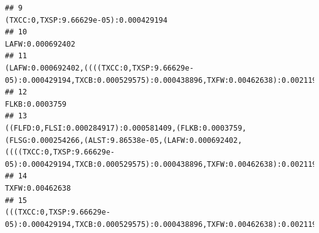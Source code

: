 \documentclass[]{article}
\begin{document}
\begin{verbatim}
## 9                                                                                                                                                                                                                                                                                                                                                                                              (TXCC:0,TXSP:9.66629e-05):0.000429194
## 10                                                                                                                                                                                                                                                                                                                                                                                                                  LAFW:0.000692402
## 11                                                                                                                                                                                                                                                                     (LAFW:0.000692402,((((TXCC:0,TXSP:9.66629e-05):0.000429194,TXCB:0.000529575):0.000438896,TXFW:0.00462638):0.0021191,ALFW:0.000685147):0.000263869):0.00044979
## 12                                                                                                                                                                                                                                                                                                                                                                                                                    FLKB:0.0003759
## 13                                                                                                                        ((FLFD:0,FLSI:0.000284917):0.000581409,(FLKB:0.0003759,(FLSG:0.000254266,(ALST:9.86538e-05,(LAFW:0.000692402,((((TXCC:0,TXSP:9.66629e-05):0.000429194,TXCB:0.000529575):0.000438896,TXFW:0.00462638):0.0021191,ALFW:0.000685147):0.000263869):0.00044979):0.00272304):0.000116498):0.000251601):0.00159115
## 14                                                                                                                                                                                                                                                                                                                                                                                                                   TXFW:0.00462638
## 15                                                                                                                                                                                                                                                                                                                                  (((TXCC:0,TXSP:9.66629e-05):0.000429194,TXCB:0.000529575):0.000438896,TXFW:0.00462638):0.0021191

\end{verbatim}
\end{document}
